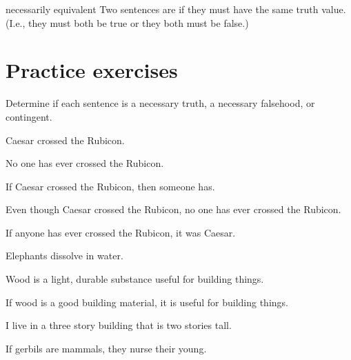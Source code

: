 \begin{factboxy}{necessarily equivalent}
Two sentences are  if they must have the same truth value. (I.e., they must both be true or they both must be false.)
\end{factboxy}


  



\section{Practice exercises}
\setcounter{ProbPart}{0}

\problempart
\label{pr.EnglishTautology2}
Determine if each sentence is a necessary truth, a necessary falsehood, or contingent.
\begin{earg}
\item Caesar crossed the Rubicon.
\item No one has ever crossed the Rubicon.
\item If Caesar crossed the Rubicon, then someone has.
\item Even though Caesar crossed the Rubicon, no one has ever crossed the Rubicon.
\item If anyone has ever crossed the Rubicon, it was Caesar.

\item Elephants dissolve in water.
\item Wood is a light, durable substance useful for building things.
\item If wood is a good building material, it is useful for building things.
\item I live in a three story building that is two stories tall.
\item If gerbils are mammals, they nurse their young.
\end{earg}

